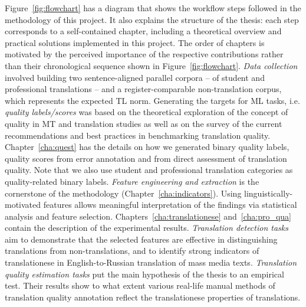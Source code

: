 Figure~\ref{fig:flowchart} has a diagram that shows the workflow steps followed in the methodology of this project. It also explains the structure of the thesis: each step corresponds to a self-contained chapter, including a theoretical overview and practical solutions implemented in this project. The order of chapters is motivated by the perceived importance of the respective contributions rather than their chronological sequence shown in Figure~\ref{fig:flowchart}. 
\textit{Data collection} involved building two sentence-aligned parallel corpora -- of student and professional translations -- and a register-comparable non-translation corpus, which represents the expected TL norm.
Generating the targets for ML tasks, i.e. \textit{quality labels/scores} was based on the theoretical exploration of the concept of quality in MT and translation studies as well as on the survey of the current recommendations and best practices in benchmarking translation quality. Chapter~\ref{cha:quest} has the details on how we generated binary quality labels, quality scores from error annotation and from direct assessment of translation quality. Note that we also use student and professional translation categories as quality-related binary labels. 
\textit{Feature engineering and extraction} is the cornerstone of the methodology (Chapter~\ref{cha:indicators}). Using linguistically-motivated features allows meaningful interpretation of the findings via statistical analysis and feature selection.
Chapters~\ref{cha:translationese} and~\ref{cha:pro_qua} contain the description of the experimental results. \textit{Translation detection tasks} aim to demonstrate that the selected features are effective in distinguishing translations from non-translations, and to identify strong indicators of translationese in English-to-Russian translation of mass media texts. \textit{Translation quality estimation tasks} put the main hypothesis of the thesis to an empirical test. Their results show to what extent various real-life manual methods of translation quality annotation reflect the translationese properties of translations.

